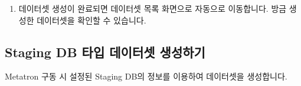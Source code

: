 \documentclass[letterpaper,10pt,english]{sphinxmanual}
\begin{document}
\begin{enumerate}
\begin{quote}
\begin{figure}[H]
\centering

\noindent{}
\end{figure}
\end{quote}

\item {} 
데이터셋 생성이 완료되면 데이터셋 목록 화면으로 자동으로 이동합니다. 방금 생성한 데이터셋을 확인할 수 있습니다.
\begin{quote}

\begin{figure}[H]
\centering

\noindent{}
\end{figure}
\end{quote}

\end{enumerate}


\subsection{Staging DB 타입 데이터셋 생성하기}
\label{\detokenize{discovery/part07/create_a_dataset:staging-db}}\label{\detokenize{discovery/part07/create_a_dataset:create-a-dataset-of-stagingdb}}
Metatron 구동 시 설정된 Staging DB의 정보를 이용하여 데이터셋을 생성합니다.
\end{document}
